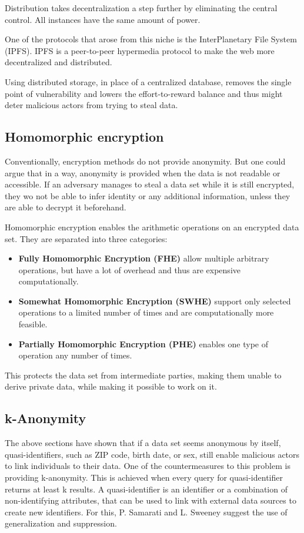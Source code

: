 Distribution takes decentralization a step further by eliminating the central control. All instances have the same amount of power.

One of the protocols that arose from this niche is the InterPlanetary File System (IPFS). IPFS is a peer-to-peer hypermedia protocol to make the web more decentralized and distributed.

Using distributed storage, in place of a centralized database, removes the single point of vulnerability and lowers the effort-to-reward balance and thus might deter malicious actors from trying to steal data.

\subsection{Homomorphic encryption}
Conventionally, encryption methods do not provide anonymity. But one could argue that in a way, anonymity is provided when the data is not readable or accessible. If an adversary manages to steal a data set while it is still encrypted, they wo not be able to infer identity or any additional information, unless they are able to decrypt it beforehand. 

Homomorphic encryption enables the arithmetic operations on an encrypted data set. They are separated into three categories:
\begin{itemize}
    \item \textbf{Fully Homomorphic Encryption (FHE)} allow multiple arbitrary operations, but have a lot of overhead and thus are expensive computationally.
    \item \textbf{Somewhat Homomorphic Encryption (SWHE)} support only selected operations to a limited number of times and are computationally more feasible.
    \item \textbf{Partially Homomorphic Encryption (PHE)} enables one type of operation any number of times.
\end{itemize}

This protects the data set from intermediate parties, making them unable to derive private data, while making it possible to work on it.

\subsection{k-Anonymity}
The above sections have shown that if a data set seems anonymous by itself, quasi-identifiers, such as ZIP code, birth date, or sex, still enable malicious actors to link individuals to their data. One of the countermeasures to this problem is providing k-anonymity. This is achieved when every query for quasi-identifier returns at least k results. A quasi-identifier is an identifier or a combination of non-identifying attributes, that can be used to link with external data sources to create new identifiers. For this, P. Samarati and L. Sweeney suggest the use of generalization and suppression.


